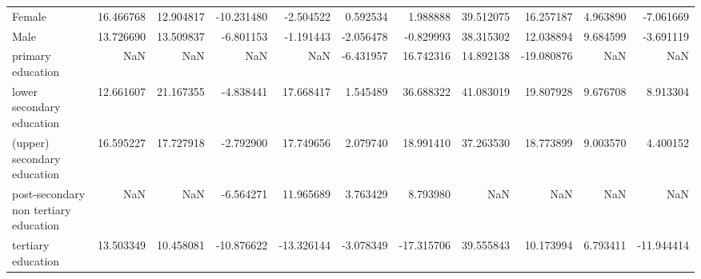 \documentclass[11pt]{article}
\begin{document}
\begin{table}[!htbp]
{\begin{tabular}{lrrrrrrrrrr}
Female                                &  16.466768 &  12.904817 & -10.231480 &  -2.504522 &   0.592534 &   1.988888 &  39.512075 &  16.257187 &   4.963890 &  -7.061669 \\
Male                                  &  13.726690 &  13.509837 &  -6.801153 &  -1.191443 &  -2.056478 &  -0.829993 &  38.315302 &  12.038894 &   9.684599 &  -3.691119 \\
primary education                     &        NaN &        NaN &        NaN &        NaN &  -6.431957 &  16.742316 &  14.892138 & -19.080876 &        NaN &        NaN \\
lower secondary education             &  12.661607 &  21.167355 &  -4.838441 &  17.668417 &   1.545489 &  36.688322 &  41.083019 &  19.807928 &   9.676708 &   8.913304 \\
(upper) secondary education           &  16.595227 &  17.727918 &  -2.792900 &  17.749656 &   2.079740 &  18.991410 &  37.263530 &  18.773899 &   9.003570 &   4.400152 \\
post-secondary non tertiary education &        NaN &        NaN &  -6.564271 &  11.965689 &   3.763429 &   8.793980 &        NaN &        NaN &        NaN &        NaN \\
tertiary education                    &  13.503349 &  10.458081 & -10.876622 & -13.326144 &  -3.078349 & -17.315706 &  39.555843 &  10.173994 &   6.793411 & -11.944414 \\
\bottomrule
\end{tabular}


}
\end{table}
\end{document}
